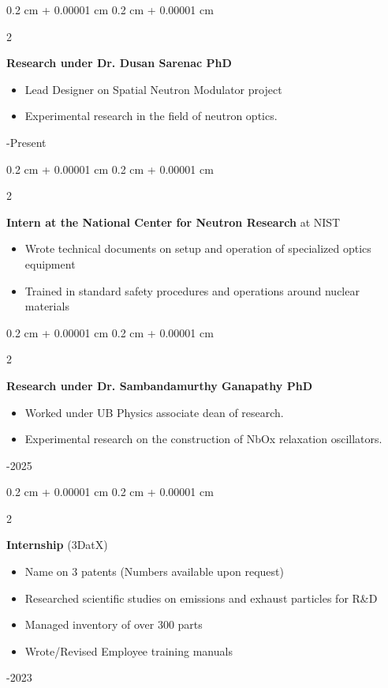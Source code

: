 \documentclass[10pt, letterpaper]{article}
\newenvironment{highlights}{
\begin{itemize}[
topsep=0.10 cm,
parsep=0.10 cm,
partopsep=0pt,
itemsep=0pt,
leftmargin=0.4 cm + 10pt
]
}{
\end{itemize}
}
\newenvironment{onecolentry}{
\begin{adjustwidth}{
0.2 cm + 0.00001 cm
}{
0.2 cm + 0.00001 cm
}
}{
\end{adjustwidth}
}
\newenvironment{twocolentry}[2][]{
\begin{onecolentry}
\def\secondColumn{#2}
\setcolumnwidth{\fill, 4.5 cm}
\begin{paracol}{2}
}{
\switchcolumn \raggedleft \secondColumn
\end{paracol}
\end{onecolentry}
}
\begin{document}
\begin{twocolentry}{
2025-Present
}
\textbf{Research under Dr. Dusan Sarenac PhD}
\begin{highlights}
\item Lead Designer on Spatial Neutron Modulator project
\item Experimental research in the field of neutron optics.
\end{highlights}
\end{twocolentry}
\vspace{0.2 cm}
\begin{twocolentry}{
2025
}
\textbf{Intern at the National Center for Neutron Research} at NIST
\begin{highlights}
\item Wrote technical documents on setup and operation of specialized optics equipment
\item Trained in standard safety procedures and operations around nuclear materials
\end{highlights}
\end{twocolentry}


\vspace{0.2 cm}

\begin{twocolentry}{
2024-2025
}
\textbf{Research under Dr. Sambandamurthy Ganapathy PhD}
\begin{highlights}
\item Worked under UB Physics associate dean of research.
\item Experimental research on the construction of NbOx relaxation oscillators.
\end{highlights}
\end{twocolentry}


\vspace{0.2 cm}
\begin{twocolentry}{
2020-2023
}
\textbf{Internship} (3DatX)
\begin{highlights}
\item Name on 3 patents (Numbers available upon request)
\item Researched scientific studies on emissions and exhaust particles for R\&D
\item Managed inventory of over 300 parts
\item Wrote/Revised Employee training manuals
\end{highlights}
\end{twocolentry}

\vspace{0.2 cm}
\end{document}
